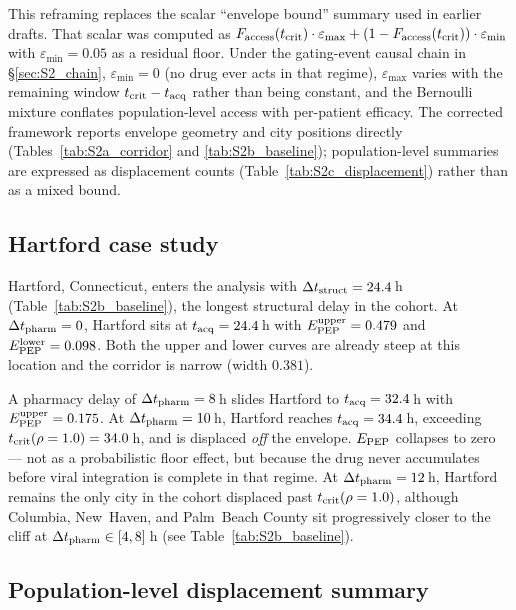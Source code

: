 \documentclass[11pt]{article}
\theoremstyle{definition}
\theoremstyle{remark}
\begin{document}
This reframing replaces the scalar ``envelope bound'' summary used in
earlier drafts.  That scalar was computed as
$F_{\rm access}(t_{\rm crit}) \cdot \varepsilon_{\max} +
(1 - F_{\rm access}(t_{\rm crit})) \cdot \varepsilon_{\min}$
with $\varepsilon_{\min} = 0.05$ as a residual floor.  Under the
gating-event causal chain in \S\ref{sec:S2_chain},
$\varepsilon_{\min} = 0$ (no drug ever acts in that regime),
$\varepsilon_{\max}$ varies with the remaining window
$t_{\rm crit} - t_{\rm acq}$ rather than being constant, and the
Bernoulli mixture conflates population-level access with per-patient
efficacy.  The corrected framework reports envelope geometry and city
positions directly (Tables~\ref{tab:S2a_corridor} and
\ref{tab:S2b_baseline}); population-level summaries are expressed as
displacement counts (Table~\ref{tab:S2c_displacement}) rather than as a
mixed bound.



\subsection{Hartford case study}
\label{sec:S2_hartford}

Hartford, Connecticut, enters the analysis with
$\Delta t_{\rm struct} = 24.4$\,h (Table~\ref{tab:S2b_baseline}), the
longest structural delay in the cohort.  At $\Delta t_{\rm pharm} = 0$,
Hartford sits at $t_{\rm acq} = 24.4$\,h with
$E_{\rm PEP}^{\rm upper} = 0.479$ and $E_{\rm PEP}^{\rm lower} = 0.098$.
Both the upper and lower curves are already steep at this location and
the corridor is narrow (width $0.381$).

A pharmacy delay of $\Delta t_{\rm pharm} = 8$\,h slides Hartford to
$t_{\rm acq} = 32.4$\,h with $E_{\rm PEP}^{\rm upper} = 0.175$.  At
$\Delta t_{\rm pharm} = 10$\,h, Hartford reaches $t_{\rm acq} = 34.4$\,h,
exceeding $t_{\rm crit}(\rho=1.0) = 34.0$\,h, and is displaced
\emph{off} the envelope.  $E_{\rm PEP}$ collapses to zero --- not as a
probabilistic floor effect, but because the drug never accumulates before
viral integration is complete in that regime.  At
$\Delta t_{\rm pharm} = 12$\,h, Hartford remains the only city in the
cohort displaced past $t_{\rm crit}(\rho=1.0)$, although Columbia,
New~Haven, and Palm~Beach County sit progressively closer to the cliff
at $\Delta t_{\rm pharm} \in [4, 8]$\,h
(see Table~\ref{tab:S2b_baseline}).

\subsection{Population-level displacement summary}
\label{sec:S2_summary}
\end{document}
